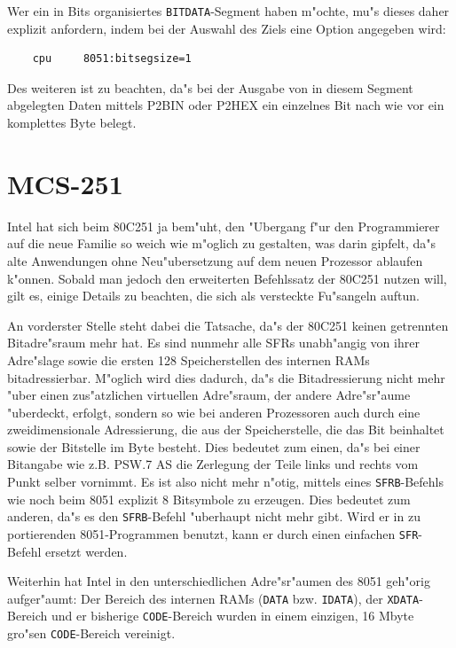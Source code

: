 \documentclass[12pt,a4paper,twoside]{report}
\newcommand{\tty}[1]{{\tt #1}}
\newcommand{\asname}{AS}
\begin{document}
Wer ein in Bits organisiertes {\tt BITDATA}-Segment haben m"ochte, mu"s
dieses daher explizit anfordern, indem bei der Auswahl des Ziels eine
Option angegeben wird:
\begin{verbatim}
	cpu     8051:bitsegsize=1
\end{verbatim}
Des weiteren ist zu beachten, da"s bei der Ausgabe von in diesem Segment
abgelegten Daten mittels P2BIN oder P2HEX ein einzelnes Bit nach wie vor
ein komplettes Byte belegt.


\section{MCS-251}

Intel hat sich beim 80C251 ja bem"uht, den "Ubergang f"ur den Programmierer
auf die neue Familie so weich wie m"oglich zu gestalten, was darin gipfelt,
da"s alte Anwendungen ohne Neu"ubersetzung auf dem neuen Prozessor ablaufen
k"onnen.  Sobald man jedoch den erweiterten Befehlssatz der 80C251 nutzen
will, gilt es, einige Details zu beachten, die sich als versteckte
Fu"sangeln auftun.
\par
An vorderster Stelle steht dabei die Tatsache, da"s der 80C251 keinen
getrennten Bitadre"sraum mehr hat.  Es sind nunmehr alle SFRs unabh"angig
von ihrer Adre"slage sowie die ersten 128 Speicherstellen des internen
RAMs bitadressierbar.  M"oglich wird dies dadurch, da"s die Bitadressierung
nicht mehr "uber einen zus"atzlichen virtuellen Adre"sraum, der andere
Adre"sr"aume "uberdeckt, erfolgt, sondern so wie bei anderen Prozessoren
auch durch eine zweidimensionale Adressierung, die aus der Speicherstelle,
die das Bit beinhaltet sowie der Bitstelle im Byte besteht.  Dies bedeutet
zum einen, da"s bei einer Bitangabe wie z.B. PSW.7 \asname{} die Zerlegung der
Teile links und rechts vom Punkt selber vornimmt.  Es ist also nicht mehr
n"otig, mittels eines \tty{SFRB}-Befehls wie noch beim 8051 explizit 8
Bitsymbole zu erzeugen.  Dies bedeutet zum anderen, da"s es den
\tty{SFRB}-Befehl "uberhaupt nicht mehr gibt.  Wird er in zu portierenden
8051-Programmen benutzt, kann er durch einen einfachen \tty{SFR}-Befehl
ersetzt werden.
\par
Weiterhin hat Intel in den unterschiedlichen Adre"sr"aumen des 8051
geh"orig aufger"aumt: Der Bereich des internen RAMs (\tty{DATA} bzw.
\tty{IDATA}), der \tty{XDATA}-Bereich und er bisherige \tty{CODE}-Bereich
wurden in einem einzigen, 16 Mbyte gro"sen \tty{CODE}-Bereich vereinigt.
\end{document}

